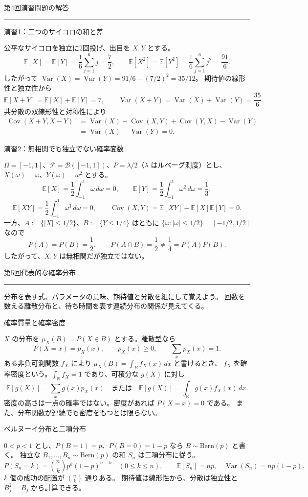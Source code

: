 \documentclass[a4paper,10pt,pdflatex,ja=standard,jafont=ipaex-type1,
  magstyle=real,scale=1]{bxjsarticle}
\newcommand{\coursename}{確率論と統計学 I}
\newcommand{\topic}[1]{\par\vspace{5pt}
  {\large\sffamily\mdseries\color{accent}#1}\par\vspace{2pt}}
\newcommand{\handouttitle}[1]{%
  \begin{center}
    {\Large\color{ink}#1}\par\vspace{3mm}
    {\color{accent}\rule{0.88\linewidth}{0.7pt}}
  \end{center}\vspace{-2mm}}
\newcommand{\keybox}[1]{\par\vspace{3pt}\begingroup
  \setlength{\fboxsep}{5pt}
  \colorbox{soft}{\parbox{\dimexpr\linewidth-2\fboxsep\relax}{#1}}%
  \endgroup\par\vspace{2pt}}
\newcommand{\F}{\mathcal F}
\newcommand{\R}{\mathbb R}
\newcommand{\E}{\mathbb E}
\newcommand{\Var}{\operatorname{Var}}
\newcommand{\Cov}{\operatorname{Cov}}
\begin{document}
\fontsize{10pt}{13.5pt}\selectfont
\begingroup
\fancyhead[L]{\small\color{ink}\coursename{}・前回の演習解答}
\handouttitle{第4回\quad 演習問題の解答}

\topic{演習1：二つのサイコロの和と差}
公平なサイコロを独立に2回投げ、出目を $X,Y$ とする。
$$
 \E[X]=\E[Y]=\frac16\sum_{j=1}^6j=\frac72,\qquad
 \E[X^2]=\E[Y^2]=\frac16\sum_{j=1}^6j^2=\frac{91}{6}.
$$
したがって $\Var(X)=\Var(Y)=91/6-(7/2)^2=35/12$。
期待値の線形性と独立性から
$$
 \E[X+Y]=\E[X]+\E[Y]=7,\qquad
 \Var(X+Y)=\Var(X)+\Var(Y)=\frac{35}{6}.
$$
共分散の双線形性と対称性により
$$\begin{aligned}
 \Cov(X+Y,X-Y)
 &=\Var(X)-\Cov(X,Y)+\Cov(Y,X)-\Var(Y)\\
 &=\Var(X)-\Var(Y)=0.
\end{aligned}$$

\topic{演習2：無相関でも独立でない確率変数}
$\Omega=[-1,1]$、$\F=\mathcal B([-1,1])$、$P=\lambda/2$（$\lambda$ はルベーグ測度）とし、
$X(\omega)=\omega$、$Y(\omega)=\omega^2$ とする。
$$
 \E[X]=\frac12\int_{-1}^1\omega\,d\omega=0,\qquad
 \E[Y]=\frac12\int_{-1}^1\omega^2\,d\omega=\frac13,
$$
$$
 \E[XY]=\frac12\int_{-1}^1\omega^3\,d\omega=0,\qquad
 \Cov(X,Y)=\E[XY]-\E[X]\E[Y]=0.
$$
一方、$A:=\{|X|\le1/2\}$、$B:=\{Y\le1/4\}$ はともに
$\{\omega:|\omega|\le1/2\}=[-1/2,1/2]$ なので
$$
 P(A)=P(B)=\frac12,\qquad
 P(A\cap B)=\frac12\ne\frac14=P(A)P(B).
$$
したがって、$X,Y$ は無相関だが独立ではない。
\clearpage
\endgroup

\handouttitle{第5回\quad 代表的な確率分布}
\keybox{分布を表す式、パラメータの意味、期待値と分散を組にして覚えよう。
回数を数える離散分布と、待ち時間を表す連続分布の関係が見えてくる。}

\topic{確率質量と確率密度}
$X$ の分布を $\mu_X(B)=P(X\in B)$ とする。離散型なら
$$P(X=x)=p_X(x),\qquad p_X(x)\ge0,\qquad \sum_xp_X(x)=1.$$
ある非負可測関数 $f_X$ により $\mu_X(B)=\int_B f_X(x)\,dx$ と書けるとき、
$f_X$ を確率密度という。$\int_\R f_X=1$ であり、可積分な $g(X)$ に対し
$$\E[g(X)]=\sum_xg(x)p_X(x)\quad\text{または}\quad
  \E[g(X)]=\int_\R g(x)f_X(x)\,dx.$$
密度の高さは一点の確率ではない。密度があれば $P(X=x)=0$ である。
また、分布関数が連続でも密度をもつとは限らない。

\topic{ベルヌーイ分布と二項分布}
$0<p<1$ とし、$P(B=1)=p$、$P(B=0)=1-p$ なら $B\sim\mathrm{Bern}(p)$ と書く。
独立な $B_1,\ldots,B_n\sim\mathrm{Bern}(p)$ の和 $S_n$ は二項分布に従う。
$$
  P(S_n=k)=\binom nkp^k(1-p)^{n-k}\quad(0\le k\le n),
  \qquad \E[S_n]=np,\quad\Var(S_n)=np(1-p).
$$
$k$ 個の成功の配置が $\binom nk$ 通りある。
期待値は線形性から、分散は独立性と $B_j^2=B_j$ から計算できる。
\end{document}
